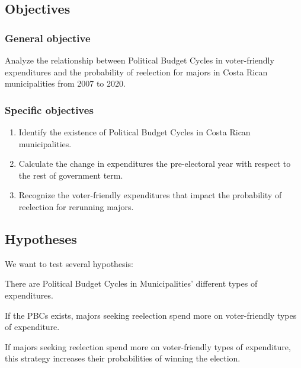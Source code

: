 
\subsection{Objectives}

\subsubsection{General objective}

Analyze the relationship between Political Budget Cycles in voter-friendly expenditures and the probability of reelection for majors in Costa Rican municipalities from 2007 to 2020. 

\subsubsection{Specific objectives}

\begin{enumerate}
	\item Identify the existence of Political Budget Cycles in Costa Rican municipalities. 
	\item Calculate the change in expenditures the pre-electoral year with respect to the rest of government term. 
	\item Recognize the voter-friendly expenditures that impact the probability of reelection for rerunning majors.
\end{enumerate}


\subsection{Hypotheses}

We want to test several hypothesis: 

\begin{hyp}\label{hyp:first}
	There are Political Budget Cycles in Municipalities' different types of expenditures. 
\end{hyp}

\begin{hyp} \label{hyp:second}
	If the PBCs exists, majors seeking reelection spend more on voter-friendly types of expenditure. 
\end{hyp}

\begin{hyp} \label{hyp:third}
	If majors seeking reelection spend more on voter-friendly types of expenditure, this strategy increases their probabilities of winning the election. 
\end{hyp}
